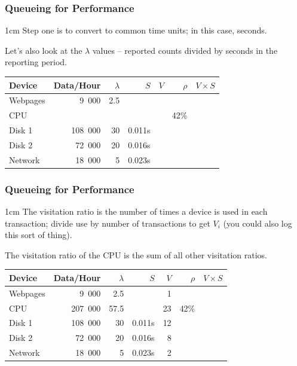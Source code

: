 \begin{frame}
\frametitle{Queueing for Performance}

\begin{changemargin}{1cm}
\large 
Step one is to convert to common time units; in this case, seconds.

Let's also look at the $\lambda$ values -- reported counts divided by seconds in the reporting period.
\end{changemargin}

\begin{center}
\begin{tabular}{l|r|r|r|r|r|r} 
	\textbf{Device} & \textbf{Data/Hour} & \textbf{$\lambda$} & \textbf{$S$} & \textbf{$V$} & \textbf{$\rho$} & \textbf{$V \times S$} \\ \hline
	Webpages & 9~000 & 2.5 & & & & \\ \hline
	CPU & & & & & 42\% & \\ \hline
	Disk 1 & 108~000 & 30 & 0.011s  & & &\\ \hline
	Disk 2 & 72~000 & 20 & 0.016s & & &\\ \hline
	Network & 18~000 & 5 & 0.023s & & &
\end{tabular}
\end{center}

\end{frame}



\begin{frame}
\frametitle{Queueing for Performance}

\begin{changemargin}{1cm}
\large 
The visitation ratio is the number of times a device is used in each transaction; divide use by number of transactions to get $V_{i}$ (you could also log this sort of thing). 

The visitation ratio of the CPU is the sum of all other visitation ratios.
\end{changemargin}

\begin{center}
\begin{tabular}{l|r|r|r|r|r|r} 
	\textbf{Device} & \textbf{Data/Hour} & \textbf{$\lambda$} & \textbf{$S$} & \textbf{$V$} & \textbf{$\rho$} & \textbf{$V \times S$} \\ \hline
	Webpages & 9~000 & 2.5 & & 1 & & \\ \hline
	CPU & 207~000 & 57.5 &  & 23 & 42\% & \\ \hline
	Disk 1 & 108~000 & 30 & 0.011s  & 12& &\\ \hline
	Disk 2 & 72~000 & 20 & 0.016s & 8 & &\\ \hline
	Network & 18~000 & 5 & 0.023s & 2 & &\\ 
\end{tabular}
\end{center}

\end{frame}



